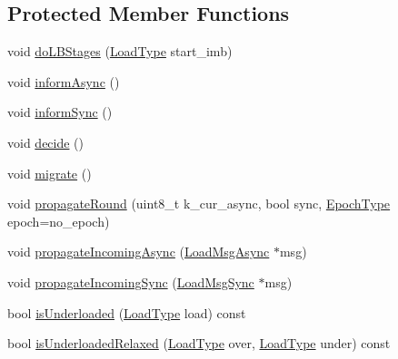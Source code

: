 \subsection*{Protected Member Functions}
\begin{DoxyCompactItemize}
\item 
void \hyperlink{structvt_1_1vrt_1_1collection_1_1lb_1_1_tempered_l_b_a58a690f2c7b0d7dd7d0911bad176face}{do\+L\+B\+Stages} (\hyperlink{namespacevt_a8fb51741340b87d7aaee0bef60e9896b}{Load\+Type} start\+\_\+imb)
\item 
void \hyperlink{structvt_1_1vrt_1_1collection_1_1lb_1_1_tempered_l_b_a316b422988867cdebad99c23d23f27ce}{inform\+Async} ()
\item 
void \hyperlink{structvt_1_1vrt_1_1collection_1_1lb_1_1_tempered_l_b_af06bd756568787d47ecded79576dc145}{inform\+Sync} ()
\item 
void \hyperlink{structvt_1_1vrt_1_1collection_1_1lb_1_1_tempered_l_b_a099523e70a588de77eec53a36aeeecdf}{decide} ()
\item 
void \hyperlink{structvt_1_1vrt_1_1collection_1_1lb_1_1_tempered_l_b_a59049101eba58eb9206606c25952bd2d}{migrate} ()
\item 
void \hyperlink{structvt_1_1vrt_1_1collection_1_1lb_1_1_tempered_l_b_a2050cb21d8142439eb1c29915e25b934}{propagate\+Round} (uint8\+\_\+t k\+\_\+cur\+\_\+async, bool sync, \hyperlink{namespacevt_a81d11b28122d43bf9834577e4a06440f}{Epoch\+Type} epoch=no\+\_\+epoch)
\item 
void \hyperlink{structvt_1_1vrt_1_1collection_1_1lb_1_1_tempered_l_b_a15dd6de3c9fe1998dae4bc685c991bb5}{propagate\+Incoming\+Async} (\hyperlink{structvt_1_1vrt_1_1collection_1_1lb_1_1_tempered_l_b_a38d9ad7e92612cdbdf564b6f49b516a7}{Load\+Msg\+Async} $\ast$msg)
\item 
void \hyperlink{structvt_1_1vrt_1_1collection_1_1lb_1_1_tempered_l_b_ab754acaf5c76886c1e61ce4f4c69b1cb}{propagate\+Incoming\+Sync} (\hyperlink{structvt_1_1vrt_1_1collection_1_1lb_1_1_tempered_l_b_aa46eb8cbc4c505f35b970f75e38b5e0d}{Load\+Msg\+Sync} $\ast$msg)
\item 
bool \hyperlink{structvt_1_1vrt_1_1collection_1_1lb_1_1_tempered_l_b_a499b448496764b6eb8c25f3dc8188e2c}{is\+Underloaded} (\hyperlink{namespacevt_a8fb51741340b87d7aaee0bef60e9896b}{Load\+Type} load) const
\item 
bool \hyperlink{structvt_1_1vrt_1_1collection_1_1lb_1_1_tempered_l_b_a9a65a386b0dbd2006db3977ecf0efe79}{is\+Underloaded\+Relaxed} (\hyperlink{namespacevt_a8fb51741340b87d7aaee0bef60e9896b}{Load\+Type} over, \hyperlink{namespacevt_a8fb51741340b87d7aaee0bef60e9896b}{Load\+Type} under) const

\end{DoxyCompactItemize}

